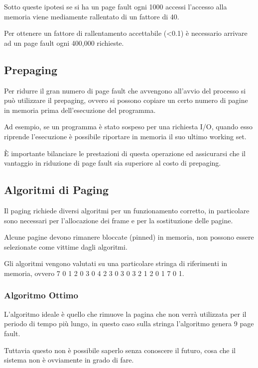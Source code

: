 Sotto queste ipotesi se si ha un page fault ogni 1000 accessi l'accesso alla memoria viene mediamente rallentato di un fattore di 40.

Per ottenere un fattore di rallentamento accettabile (<0.1) è necessario arrivare ad un page fault ogni 400,000 richieste.

\subsection{Prepaging}
Per ridurre il gran numero di page fault che avvengono all'avvio del processo si può utilizzare il prepaging, ovvero si possono copiare un certo numero di pagine in memoria prima dell'esecuzione del programma.

\spacer
Ad esempio, se un programma è stato sospeso per una richiesta I/O, quando esso riprende l'esecuzione è possibile riportare in memoria il suo ultimo working set.

\spacer
È importante bilanciare le prestazioni di questa operazione ed assicurarsi che il vantaggio in riduzione di page fault sia superiore al costo di prepaging.

\subsection{Algoritmi di Paging}
Il paging richiede diversi algoritmi per un funzionamento corretto, in particolare sono necessari per l'allocazione dei frame e per la sostituzione delle pagine.

\begin{note}
    Alcune pagine devono rimanere bloccate (pinned) in memoria, non possono essere selezionate come vittime dagli algoritmi.
\end{note}

Gli algoritmi vengono valutati su una particolare stringa di riferimenti in memoria, ovvero 7 0 1 2 0 3 0 4 2 3 0 3 0 3 2 1 2 0 1 7 0 1.

\subsubsection{Algoritmo Ottimo}
L'algoritmo ideale è quello che rimuove la pagina che non verrà utilizzata per il periodo di tempo più lungo, in questo caso sulla stringa l'algoritmo genera 9 page fault.

Tuttavia questo non è possibile saperlo senza conoscere il futuro, cosa che il sistema non è ovviamente in grado di fare.

